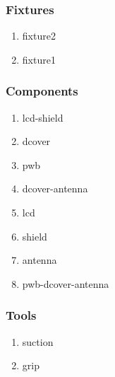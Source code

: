 \documentclass[10pt,a4paper]{report}
\begin{document}
\subsubsection*{Fixtures}
\begin{enumerate}
\item fixture2
\item fixture1
\end{enumerate}

\subsubsection*{Components}
\begin{enumerate}
\item lcd-shield
\item dcover
\item pwb
\item dcover-antenna
\item lcd
\item shield
\item antenna
\item pwb-dcover-antenna
\end{enumerate}

\subsubsection*{Tools}
\begin{enumerate}
\item suction
\item grip
\end{enumerate}

\newcommand*\rot{\rotatebox{90}}
\end{document}
